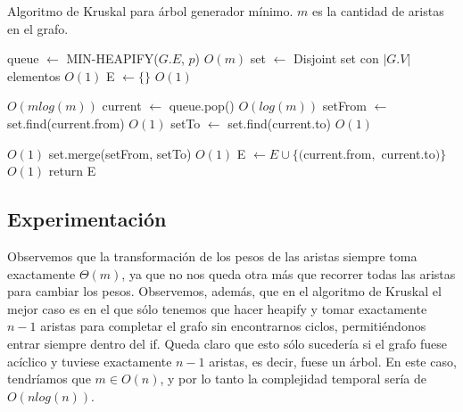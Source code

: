 \documentclass{article}
\theoremstyle{definition}
\theoremstyle{remark}
\begin{document}
\begin{algorithm}[h!]
\caption{Algoritmo de Kruskal para árbol generador mínimo. $m$ es la cantidad de aristas en el grafo. \label{alg:kruskal}}

\begin{algorithmic}[h!]
\State queue $\gets$ MIN-HEAPIFY($G.E$, $p$) \Comment $O(m)$
\State set $\gets$ Disjoint set con $|G.V|$ elementos \Comment $O(1)$
\State E $\gets \{\}$ \Comment $O(1)$

 \Comment $O(m log(m))$
\State current $\gets$ queue.pop() \Comment $O(log(m))$
\State setFrom $\gets$ set.find(current.from) \Comment $O(1)$
\State setTo $\gets$ set.find(current.to) \Comment $O(1)$

 \Comment $O(1)$
\State set.merge(setFrom, setTo) \Comment $O(1)$
\State E $\gets E \cup \{($current.from$,$ current.to$)\}$ \Comment $O(1)$
\EndIf
\EndWhile
\State return E
\EndProcedure
\end{algorithmic}
\end{algorithm}

\subsection{Experimentación}

Observemos que la transformación de los pesos de las aristas siempre toma exactamente $\Theta(m)$, ya que no nos queda otra más que recorrer todas las aristas para cambiar los pesos. Observemos, además, que en el algoritmo de Kruskal el mejor caso es en el que sólo tenemos que hacer heapify y tomar exactamente $n - 1$ aristas para completar el grafo sin encontrarnos ciclos, permitiéndonos entrar siempre dentro del if. Queda claro que esto sólo sucedería si el grafo fuese acíclico y tuviese exactamente $n - 1$ aristas, es decir, fuese un árbol. En este caso, tendríamos que $m \in O(n)$, y por lo tanto la complejidad temporal sería de $O(n log(n))$.

\end{document}
